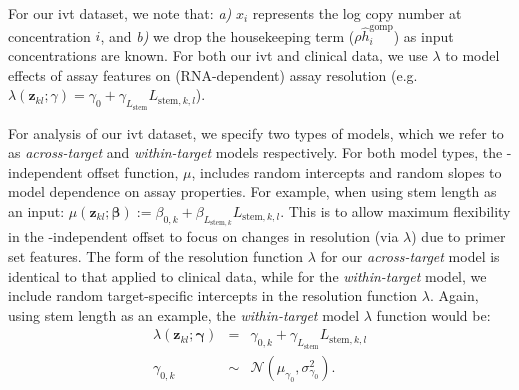 \documentclass[../thesis.tex]{subfiles}
\begin{document}
For our \gls{ivt}  dataset, we note that: \emph{a)} $x_{i}$ represents the log  copy number at concentration $i$, and \emph{b)} we drop the housekeeping term ($\rho\hat{h}^{\text{gomp}}_{i}$) as input  concentrations are known. For both our \gls{ivt}   and clinical data, we use $\lambda$ to model effects of assay features on (RNA-dependent) assay resolution (e.g. $\lambda(\bm{z}_{kl}; \gamma) = \gamma_{0} + \gamma_{L_{\text{stem}}} L_{\text{stem},k,l}$).

For analysis of our \gls{ivt}  dataset, we specify two types of models, which we refer to as \emph{across-target} and \emph{within-target} models respectively. 
For both model types, the -independent offset function, $\mu$, includes random intercepts and random slopes to model dependence on assay properties. For example, when using stem length as an input: $\mu(\bm{z}_{kl}; \bm{\beta}) := \beta_{0,k} + \beta_{L_{\text{stem},k}} L_{\text{stem},k,l}$. This is to allow maximum flexibility in the -independent offset to focus on changes in resolution (via $\lambda$) due to primer set features.
The form of the resolution function $\lambda$ for our \emph{across-target} model is identical to that applied to clinical data, while for the \emph{within-target} model, we include random target-specific intercepts in the resolution function $\lambda$. Again, using stem length as an example, the \emph{within-target} model $\lambda$ function would be:
\begin{eqnarray}
\lambda(\bm{z}_{kl}; \bm{\gamma}) &=& \gamma_{0,k} + \gamma_{L_{\text{stem}}} L_{\text{stem},k,l} \\
\gamma_{0,k} &\sim&  \mathcal{N}(\mu_{\gamma_{0}}, \sigma^{2}_{\gamma_{0}}).    
\end{eqnarray}
\end{document}
